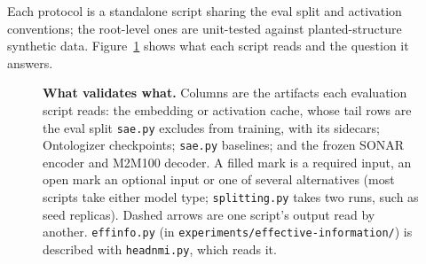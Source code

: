 Each protocol is a standalone script sharing the eval split and activation
conventions; the root-level ones are unit-tested against planted-structure
synthetic data. Figure~\ref{fig:evalpipeline} shows what each script
reads and the question it answers.

\begin{figure}[tp]
\centering
\resizebox{\linewidth}{!}{}
\caption[What validates what]{\textbf{What validates what.} Columns are
	the artifacts each evaluation script reads: the embedding or activation
	cache, whose tail rows are the eval split \texttt{sae.py} excludes from
	training, with its sidecars; Ontologizer checkpoints; \texttt{sae.py}
	baselines; and the frozen SONAR encoder and M2M100 decoder. A filled
	mark is a required input, an open mark an optional input or one of
	several alternatives (most scripts take either model type;
	\texttt{splitting.py} takes two runs, such as seed replicas). Dashed
	arrows are one script's output read by another. \texttt{effinfo.py}
	(in \texttt{experiments/effective-information/}) is described with
	\texttt{headnmi.py}, which reads it.}
\label{fig:evalpipeline}
\end{figure}

